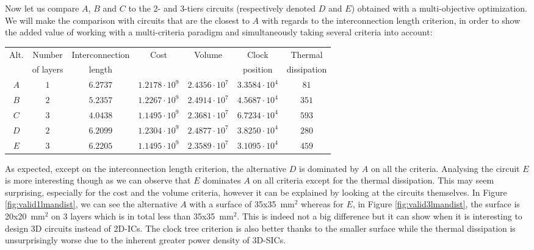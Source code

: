 Now let us compare $A$, $B$ and $C$ to the 2- and 3-tiers circuits (respectively denoted $D$ and $E$) obtained with a multi-objective optimization. We will make the comparison with circuits that are the closest to $A$ with regards to the interconnection length criterion, in order to show the added value of working with a multi-criteria paradigm and simultaneously taking several criteria into account:
\begin{center}
\begin{footnotesize}
\begin{tabular}{c|c|ccccc}
Alt. & Number & Interconnection & Cost & Volume & Clock & Thermal\\
 & of layers & length & & & position & dissipation\\
\hline
$A$ & $1$ & $6.2737$ & $1.2178\cdot10^9$ & $2.4356\cdot 10^7$ & $3.3584\cdot 10^4$ & $81$ \\
$B$ & $2$ & $5.2357$ & $1.2267\cdot10^9$ & $2.4914\cdot 10^7$ & $4.5687\cdot 10^4$ & $351$ \\
$C$ & $3$ & $4.0438$ & $1.1495\cdot10^9$ & $2.3681\cdot 10^7$ & $6.7234\cdot 10^4$ & $593$ \\
$D$ & $2$ & $6.2099$ & $1.2304\cdot10^9$ & $2.4877\cdot 10^7$ & $3.8250\cdot 10^4$ & $280$ \\
$E$ & $3$ & $6.2205$ & $1.1495\cdot10^9$ & $2.3589\cdot 10^7$ & $3.1095\cdot 10^4$ & $459$ \\
\end{tabular}
\end{footnotesize}
\end{center}

As expected, except on the interconnection length criterion, the alternative $D$ is dominated by $A$ on all the criteria. Analysing the circuit $E$ is more interesting though as we can observe that $E$ dominates $A$ on all criteria except for the thermal dissipation. This may seem surprising, especially for the cost and the volume criteria, however it can be explained by looking at the circuits themselves. In Figure \ref{fig:valid1lmandist}, we can see the alternative $A$ with a surface of \texttildelow 35x35~mm$^2$ whereas for $E$, in Figure \ref{fig:valid3lmandist}, the surface is \texttildelow 20x20~mm$^2$ on 3 layers which is in total less than 35x35~mm$^2$. This is indeed not a big difference but it can show when it is interesting to design 3D circuits instead of 2D-ICs. The clock tree criterion is also better thanks to the smaller surface while the thermal dissipation is unsurprisingly worse due to the inherent greater power density of 3D-SICs. 

